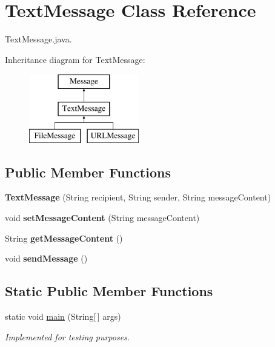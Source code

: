\hypertarget{class_text_message}{}\section{Text\+Message Class Reference}
\label{class_text_message}


Text\+Message.\+java.  


Inheritance diagram for Text\+Message\+:\begin{figure}[H]
\begin{center}
\leavevmode
\includegraphics[height=3.000000cm]{class_text_message}
\end{center}
\end{figure}
\subsection*{Public Member Functions}
\begin{DoxyCompactItemize}
\item 
\mbox{\label{class_text_message_a5836488ebd4cf272973a9d86aba5b947}} 
{\bfseries Text\+Message} (String recipient, String sender, String message\+Content)
\item 
\mbox{\label{class_text_message_a7cfe165a3ad870ae2b1979ba1c2f7b6c}} 
void {\bfseries set\+Message\+Content} (String message\+Content)
\item 
\mbox{\label{class_text_message_a2ab60ed6752642092be32157d01689d8}} 
String {\bfseries get\+Message\+Content} ()
\item 
\mbox{\label{class_text_message_a2984283095d6e8e6d91460264b831366}} 
void {\bfseries send\+Message} ()
\end{DoxyCompactItemize}
\subsection*{Static Public Member Functions}
\begin{DoxyCompactItemize}
\item 
\mbox{\label{class_text_message_a2eafe943799343f3613eec8ef11e6b58}} 
static void \hyperlink{class_text_message_a2eafe943799343f3613eec8ef11e6b58}{main} (String\mbox{[}$\,$\mbox{]} args)
\begin{DoxyCompactList}\small\item\em Implemented for testing purposes. \end{DoxyCompactList}\end{DoxyCompactItemize}


